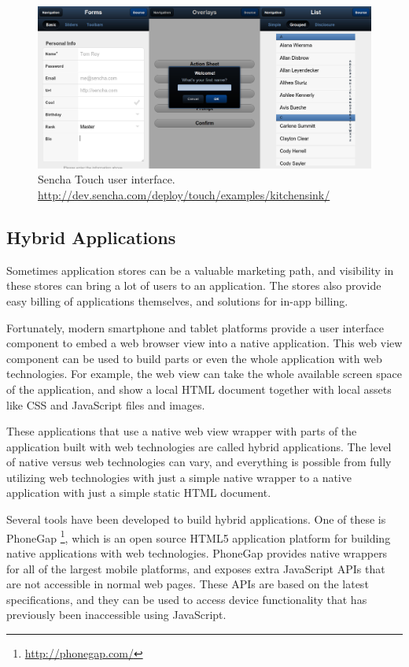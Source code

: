 \begin{figure}[ht]
  \begin{center}
    \includegraphics[width=\textwidth]{images/sencha.png}
    \caption{Sencha Touch user
      interface. \url{http://dev.sencha.com/deploy/touch/examples/kitchensink/}}
    \label{figure:sencha.png}
  \end{center}
\end{figure}

\subsection{Hybrid Applications}

Sometimes application stores can be a valuable marketing path, and
visibility in these stores can bring a lot of users to an
application. The stores also provide easy billing of applications
themselves, and solutions for in-app
billing. \cite{cortimiglia2011mobile}

Fortunately, modern smartphone and tablet platforms provide a user
interface component to embed a web browser view into a native
application. This web view component can be used to build parts or
even the whole application with web technologies. For example, the web
view can take the whole available screen space of the application, and
show a local HTML document together with local assets like CSS and
JavaScript files and images.

These applications that use a native web view wrapper with parts of
the application built with web technologies are called hybrid
applications. The level of native versus web technologies can vary,
and everything is possible from fully utilizing web technologies with
just a simple native wrapper to a native application with just a
simple static HTML document.

Several tools have been developed to build hybrid applications. One of
these is PhoneGap \footnote{\url{http://phonegap.com/}}, which is an
open source HTML5 application platform for building native
applications with web technologies. PhoneGap provides native wrappers
for all of the largest mobile platforms, and exposes extra JavaScript
APIs that are not accessible in normal web pages. These APIs are based
on the latest specifications, and they can be used to access device
functionality that has previously been inaccessible using JavaScript.

